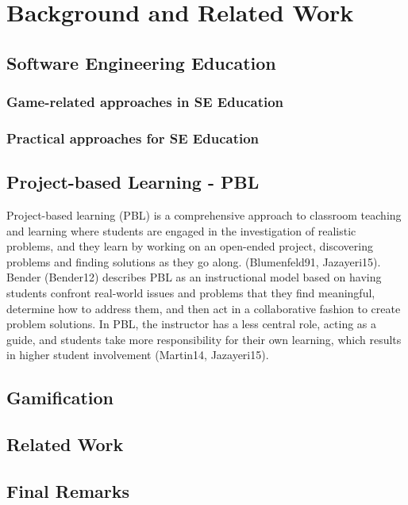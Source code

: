 \chapter{Background and Related Work}
\label{ch:background}

\section{Software Engineering Education}

\subsection{Game-related approaches in SE Education}



\subsection{Practical approaches for SE Education}

\section{Project-based Learning - PBL}

Project-based learning (PBL) is a comprehensive approach to classroom teaching and learning where students are engaged in the investigation of realistic problems, and they learn by working on an open-ended project, discovering problems and finding solutions as they go along. (Blumenfeld91, Jazayeri15). Bender (Bender12) describes PBL as an instructional model based on having students confront real-world issues and problems that they find meaningful, determine how to address them, and then act in a collaborative fashion to create problem solutions. In PBL, the instructor has a less central role, acting as a guide, and students take more responsibility for their own learning, which results in higher student involvement (Martin14, Jazayeri15).


\section{Gamification}

\section{Related Work}

\section{Final Remarks}